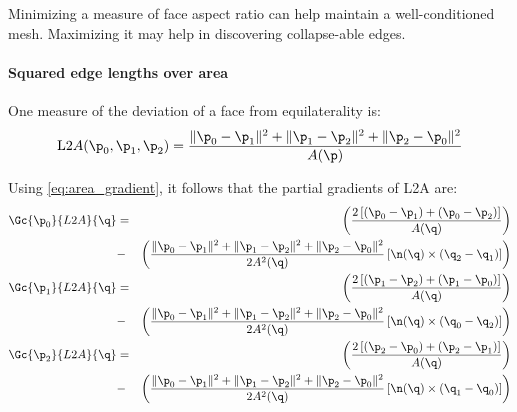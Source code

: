 Minimizing a measure of face aspect ratio can help maintain
a well-conditioned mesh.
Maximizing it may help in discovering collapse-able edges.


\paragraph{Squared edge lengths over area}
\label{sec:Squared-edge-lengths-over-area}

One measure of the deviation of a face from equilaterality is:
\begin{equation}
{\mathrm L2A}(\p_0,\p_1,\p_2)
=  {{ \| \p_0 - \p_1 \|^2 + \| \p_1 - \p_2 \|^2 + \| \p_2 - \p_0 \|^2 }
\over
{A(\p)} }
\end{equation}

Using \ref{eq:area_gradient}, it follows that the
partial gradients of L2A are:
\begin{eqnarray}
\label{eq:L2A_gradient}
\Gc{\p_0}{L2A}{\q}
& =
&
\left(
\frac{2\left[ \left( \p_0 - \p_1 \right) + \left( \p_0 - \p_2 \right) \right]}
{A(\q)}
\right)
\\
& - &
\left(
\frac{ \| \p_0 - \p_1 \|^2 + \| \p_1 - \p_2 \|^2 + \| \p_2 - \p_0 \|^2 }
{2 A^2(\q)}
\left[ \n(\q) \times (\q_2 - \q_1)
\right]
\right)
\nonumber \\
\Gc{\p_1}{L2A}{\q}
& =
&
\left(
\frac{2\left[ \left( \p_1 - \p_2 \right) + \left( \p_1 - \p_0 \right) \right]}
{A(\q)}
\right)
\nonumber
\\
& - &
\left(
\frac{ \| \p_0 - \p_1 \|^2 + \| \p_1 - \p_2 \|^2 + \| \p_2 - \p_0 \|^2 }
{2 A^2(\q)}
\left[ \n(\q) \times (\q_0 - \q_2) \right]
\right)
\nonumber
\\
\Gc{\p_2}{L2A}{\q}
& =
&
\left(
\frac{2\left[ \left( \p_2 - \p_0 \right) + \left( \p_2 - \p_1 \right) \right]}
{A(\q)}
\right)
\nonumber
\\
& - &
\left(
\frac{ \| \p_0 - \p_1 \|^2 + \| \p_1 - \p_2 \|^2 + \| \p_2 - \p_0 \|^2 }
{2 A^2(\q)}
\left[ \n(\q) \times (\q_1 - \q_0) \right]
\right)
\nonumber
\end{eqnarray}